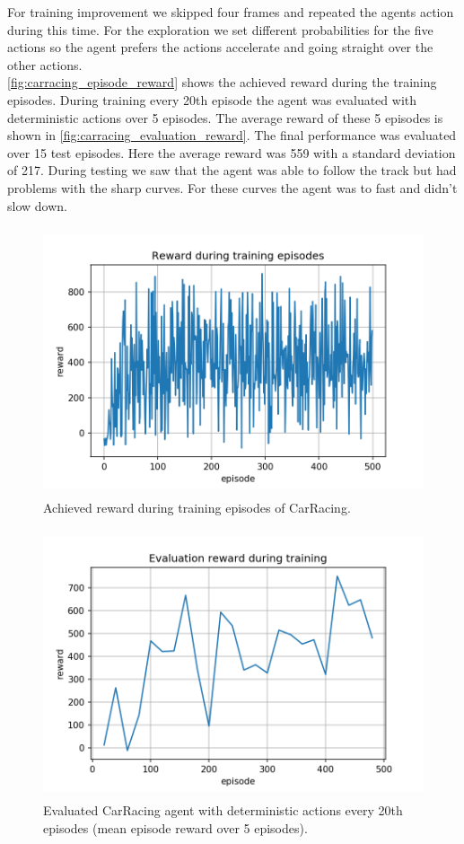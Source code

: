 \documentclass[a4paper,12pt]{article}
\begin{document}
For training improvement we skipped four frames and repeated the agents action during this time. For the exploration we set different probabilities for the five actions so the agent prefers the actions accelerate and going straight over the other actions.\\

\autoref{fig:carracing_episode_reward} shows the achieved reward during the training episodes. During training every 20th episode the agent was evaluated with deterministic actions over 5 episodes. The average reward of these 5 episodes is shown in \autoref{fig:carracing_evaluation_reward}. The final performance was evaluated over 15 test episodes. Here the average reward was 559 with a standard deviation of 217. During testing we saw that the agent was able to follow the track but had problems with the sharp curves. For these curves the agent was to fast and didn't slow down.

\begin{figure}[H]
	\centering \includegraphics[width=11.70cm, height=7.9cm]{plots/carracing_episode_reward.png}
	\caption{
		\label{fig:carracing_episode_reward}
		Achieved reward during training episodes of CarRacing.
	}
\end{figure}

\begin{figure}[H]
	\centering \includegraphics[width=11.70cm, height=7.9cm]{plots/carracing_evaluation_reward.png}
	\caption{
		\label{fig:carracing_evaluation_reward}
		Evaluated CarRacing agent with deterministic actions every 20th episodes (mean episode reward over 5 episodes).
	}
\end{figure}
\end{document}

